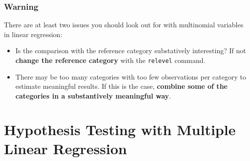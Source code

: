 \documentclass{beamer}\usepackage{graphicx, color}
\begin{document}
\begin{frame}[fragile]
  \frametitle{Warning}
  There are at least two issues you should look out for with multinomial variables in linear regression:
  \begin{itemize}
    \item Is the comparison with the reference category substatively interesting? If not \textbf{change the reference category} with the \texttt{relevel} command.
    \item There may be too many categories with too few observations per category to estimate meaningful results. If this is the case, \textbf{combine some of the categories in a substantively meaningful way}.
  \end{itemize}
\end{frame}

\section{Hypothesis Testing with Multiple Linear Regression}

\end{document}
